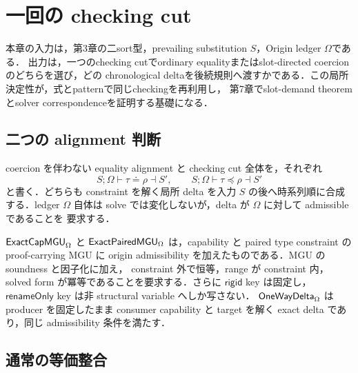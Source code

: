 \section{一回の checking cut}

本章の入力は，第3章の二sort型，prevailing substitution $S$，Origin ledger $\Omega$である．
出力は，一つのchecking cutでordinary equalityまたはslot-directed coercionのどちらを選び，どの
chronological deltaを後続規則へ渡すかである．この局所決定性が，式とpatternで同じcheckingを再利用し，
第7章でslot-demand theoremとsolver correspondenceを証明する基礎になる．

\subsection{二つの alignment 判断}

coercion を伴わない equality alignment と checking cut 全体を，それぞれ
\[
S;\Omega\vdash\tau\doteq\rho\dashv S',
\qquad
S;\Omega\vdash\tau\preccurlyeq\rho\dashv S'
\]
と書く．どちらも constraint を解く局所 delta を入力 $S$ の後へ時系列順に合成する．ledger
$\Omega$ 自体は solve では変化しないが，delta が $\Omega$ に対して admissible であることを
要求する．

$\mathsf{ExactCapMGU}_\Omega$ と $\mathsf{ExactPairedMGU}_\Omega$ は，capability と paired type constraint の
proof-carrying MGU に origin admissibility を加えたものである．MGU の soundness と因子化に加え，
constraint 外で恒等，range が constraint 内，solved form が冪等であることを要求する．さらに
$\mathsf{rigid}$ key は固定し，$\mathsf{renameOnly}$ key は非 structural variable へしか写さない．
$\mathsf{OneWayDelta}_\Omega$ は producer を固定したまま consumer capability と target を解く exact
delta であり，同じ admissibility 条件を満たす．

\subsection{通常の等価整合}

